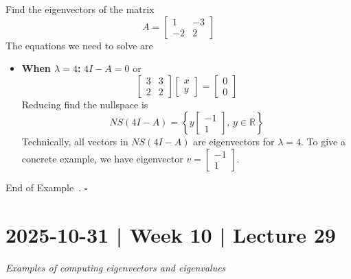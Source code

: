 \documentclass[10pt]{article}
\theoremstyle{definition}
\newtheorem{example}[theorem]{Example}
\renewenvironment{example}
{\begin{oldexample}}
  {\par\smallskip\hfill   End of Example~\theexample. $\square$    \par\end{oldexample}}
\newcommand{\R}{\mathbb{R}}           %
\begin{document}
\begin{example}
  Find the eigenvectors of the matrix
  \begin{equation*}
    A=
    \begin{bmatrix}
      1&-3\\
      -2&2
    \end{bmatrix}
  \end{equation*}
  The equations we need to solve are
  \begin{itemize}
    \item \textbf{When $\lambda=4$:} $4I-A=0$ or
    \begin{equation*}
      \begin{bmatrix}
        3&3\\
        2&2
      \end{bmatrix}
      \begin{bmatrix}
        x\\y
      \end{bmatrix}
      =
      \begin{bmatrix}
        0\\0
      \end{bmatrix}
    \end{equation*}
    Reducing find the nullspace is
    \begin{equation*}
      NS(4I-A) = \left\{y 
        \begin{bmatrix}
          -1\\1
        \end{bmatrix}, \, y\in \R
      \right\} 
    \end{equation*}
    Technically, all vectors in $NS(4I-A)$ are eigenvectors for $\lambda=4$.
    To give a concrete example, we have eigenvector $v=
    \begin{bmatrix}
      -1\\1
    \end{bmatrix}$.
    
  \end{itemize}
\end{example}
\newpage
\section{2025-10-31 | Week 10 | Lecture 29}
\textit{Examples of computing eigenvectors and eigenvalues}
\end{document}
